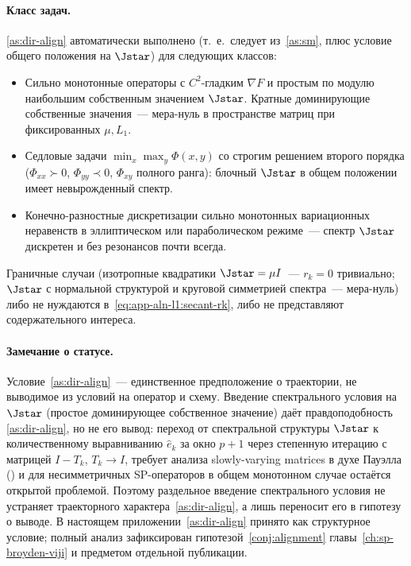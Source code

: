 \paragraph{Класс задач.}
\ref{as:dir-align} автоматически выполнено
\textup{(}т.~е.~следует из~\ref{as:sm}, \cite[Theorem~3.4]{Agafonov2024VIJI}
плюс условие общего положения на $\Jstar$\textup{)} для следующих классов:
\begin{itemize}\itemsep0pt
  \item Сильно монотонные операторы с $C^{2}$-гладким $\nabla F$
    и простым по модулю наибольшим собственным значением $\Jstar$.
    Кратные доминирующие собственные значения~--- мера-нуль в
    пространстве матриц при фиксированных $\mu,L_1$.
  \item Седловые задачи $\min_x\max_y\Phi(x,y)$ со строгим решением
    второго порядка \textup{(}$\Phi_{xx}\succ 0$, $\Phi_{yy}\prec 0$,
    $\Phi_{xy}$ полного ранга\textup{)}: блочный $\Jstar$ в общем
    положении имеет невырожденный спектр.
  \item Конечно-разностные дискретизации сильно монотонных вариационных
    неравенств в эллиптическом или параболическом режиме~--- спектр
    $\Jstar$ дискретен и без резонансов почти всегда.
\end{itemize}
Граничные случаи \textup{(}изотропные квадратики $\Jstar = \mu I$~---
$r_k=0$ тривиально; $\Jstar$ с нормальной структурой и круговой
симметрией спектра~--- мера-нуль\textup{)} либо не нуждаются
в~\eqref{eq:app-aln-l1:secant-rk}, либо не представляют содержательного интереса.

\paragraph{Замечание о статусе.}
Условие~\ref{as:dir-align}~--- единственное предположение о
траектории, не выводимое из условий на оператор и схему. Введение
спектрального условия на $\Jstar$ \textup{(}простое доминирующее
собственное значение\textup{)} даёт правдоподобность
\ref{as:dir-align}, но не его вывод: переход от спектральной
структуры $\Jstar$ к количественному выравниванию $\hat e_k$ за
окно $p+1$ через степенную итерацию с матрицей $I - T_k$, $T_k\to I$,
требует анализа slowly-varying matrices в духе Пауэлла
\textup{(}\cite{powell1971}\textup{)} и для несимметричных
SP-операторов в общем монотонном случае остаётся открытой
проблемой. Поэтому раздельное введение спектрального условия не
устраняет траекторного характера~\ref{as:dir-align}, а лишь
переносит его в гипотезу о выводе. В настоящем
приложении~\ref{as:dir-align} принято как структурное условие;
полный анализ зафиксирован
гипотезой~\ref{conj:alignment} главы~\ref{ch:sp-broyden-viji} и
предметом отдельной публикации.

